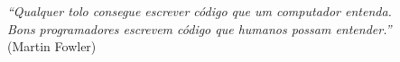 %
%
\begin{epigrafe}
    \vspace*{\fill}
	\begin{flushright}
    \begin{minipage}{9cm}
		\textit{``Qualquer tolo consegue escrever código que um computador entenda.\\
		Bons programadores escrevem código que humanos possam entender.''}\\
		(Martin Fowler)

    \end{minipage}
	\end{flushright}
\end{epigrafe}


